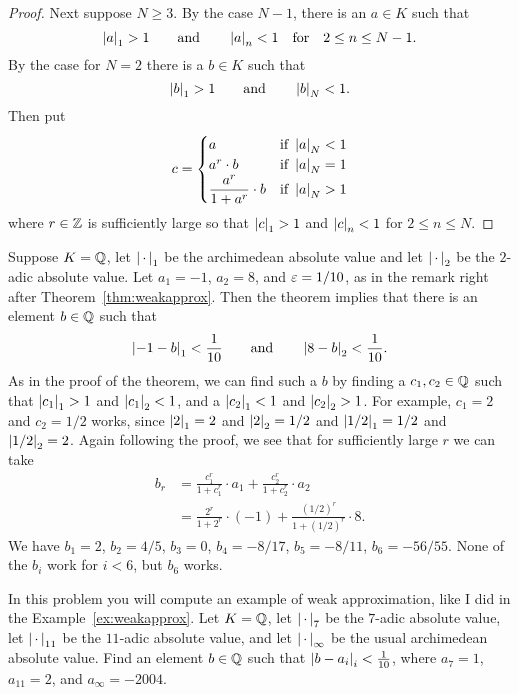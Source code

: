 \begin{proof}
Next suppose $N\geq 3$.  By the case $N-1$, there is an $a\in K$ such
that 
$$
  \left|a\right|_1 > 1 \qquad \text{and} \qquad \left|a\right|_n<1 \quad
\text{for} \quad 2\leq n\leq N-1.
$$
By the case for $N=2$ there is a $b\in K$ such that 
$$
   \left|b\right|_1>1 \qquad\text{and}\qquad\left|b\right|_N<1.
$$
Then put
$$
c = \begin{cases}
  a & \text{if } \left|a\right|_N<1\\
  a^r\cdot b & \text{if } \left|a\right|_N=1\\
  {\displaystyle\frac{a^r}{1+a^r}}\cdot b & \text{if }\left|a\right|_N>1
\end{cases}
$$
where $r\in\mathbb{Z}$ is sufficiently large so that
$\left|c\right|_1>1$ and $\left|c\right|_n<1$ for $2\leq n\leq N$.
\end{proof}

\begin{example}\label{ex:weakapprox}
  Suppose $K=\mathbb{Q}$, let $\left|\,\cdot\,\right|_1$ be the archimedean absolute value
  and let $\left|\,\cdot\,\right|_2$ be the $2$-adic absolute value.  Let $a_1=-1$,
  $a_2=8$, and $\varepsilon=1/10$, as in the remark right after
  Theorem~\ref{thm:weakapprox}.  Then the theorem implies that there
  is an element $b\in \mathbb{Q}$ such that 
$$
 \left|-1-b\right|_1 < \frac{1}{10} \qquad\text{and}\qquad \left|8-b\right|_2 < \frac{1}{10}.
 $$
 As in the proof of the theorem, we can find such a $b$ by finding
 a $c_1, c_2\in\mathbb{Q}$ such that $\left|c_1\right|_1>1$ and $\left|c_1\right|_2<1$, and
a $\left|c_2\right|_1<1$ and $\left|c_2\right|_2>1$.  For example,
 $c_1=2$ and $c_2=1/2$ works, since $\left|2\right|_1 = 2$ and $\left|2\right|_2 =
 1/2$ and 
$\left|1/2\right|_1=1/2$ and $\left|1/2\right|_2=2$.  Again
 following the proof, we see that for sufficiently large $r$
we can take 
\begin{align*}
   b_r &= \frac{c_1^r}{1+c_1^r} \cdot a_1 + 
     \frac{c_2^r}{1+c_2^r} \cdot a_2\\
     &=\frac{2^r}{1+2^r} \cdot (-1) + 
     \frac{(1/2)^r}{1+(1/2)^r} \cdot 8.
   \end{align*}
We have $b_1 = 2$, $b_2 = 4/5$, $b_3 = 0$, $b_4 = -8/17$, 
$b_5 = -8/11$, $b_6 = -56/55$.  None of the $b_i$ work for $i<6$,
but $b_6$ works.
\end{example} 

\begin{exercise}\label{ex:topology9}
  In this problem you will compute an example of weak
  approximation, like I did in the Example~\ref{ex:weakapprox}.  Let
  $K=\mathbb{Q}$, let $\left|\,\cdot\,\right|_7$ be the $7$-adic absolute value, let
  $\left|\,\cdot\,\right|_{11}$ be the $11$-adic absolute value, and let
  $\left|\,\cdot\,\right|_{\infty}$ be the usual archimedean absolute value.  Find an
  element $b\in \mathbb{Q}$ such that $\left|b-a_i\right|_i<\frac{1}{10}$, where $a_7
  = 1$, $a_{11} = 2$, and $a_{\infty} = -2004$.
\end{exercise}

